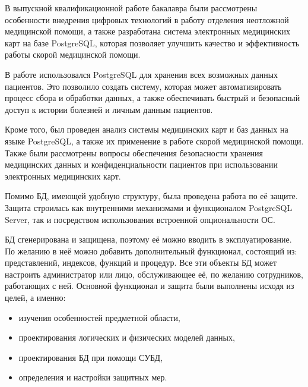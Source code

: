 \conclusion

В выпускной квалификационной работе бакалавра были рассмотрены особенности внедрения цифровых технологий в работу отделения неотложной медицинской помощи, а также разработана система электронных медицинских карт на базе PostgreSQL, которая позволяет улучшить качество и эффективность работы скорой медицинской помощи.

В работе использовался PostgreSQL для хранения всех возможных данных пациентов. Это позволило создать систему, которая может автоматизировать процесс сбора и обработки данных, а также обеспечивать быстрый и безопасный доступ к истории болезней и личным данным пациентов.

Кроме того, был проведен анализ системы медицинских карт и баз данных на языке PostgreSQL, а также их применение в работе скорой медицинской помощи. Также были рассмотрены вопросы обеспечения безопасности хранения медицинских данных и конфиденциальности пациентов при использовании электронных медицинских карт.

Помимо БД, имеющей удобную структуру, была проведена работа по её защите. Защита строилась как внутренними механизмами и функционалом PostgreSQL Server, так и посредством использования встроенной опциональности ОС.

БД сгенерирована и защищена, поэтому её можно вводить в эксплуатирование. По желанию в неё можно добавить дополнительный функционал, состоящий из: представлений, индексов, функций и процедур. Все эти объекты БД может настроить администратор или лицо, обслуживающее её, по желанию сотрудников, работающих с ней. Основной функционал и защита были выполнены исходя из целей, а именно:

\begin{itemize}
    \item изучения особенностей предметной области,
    \item проектирования логических и физических моделей данных,
    \item проектирования БД при помощи СУБД,
    \item определения и настройки защитных мер.
\end{itemize}
